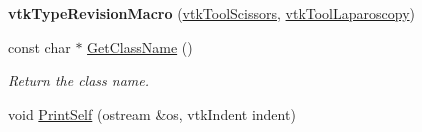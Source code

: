 \begin{DoxyCompactItemize}
\item 
\hypertarget{classvtkToolScissors_a0dfdaf5d716eb50265221bbdef3f702d}{
{\bfseries vtkTypeRevisionMacro} (\hyperlink{classvtkToolScissors}{vtkToolScissors}, \hyperlink{classvtkToolLaparoscopy}{vtkToolLaparoscopy})}
\label{classvtkToolScissors_a0dfdaf5d716eb50265221bbdef3f702d}

\item 
\hypertarget{classvtkToolScissors_a7770d9aeef652f55e1f8a4bd5bbc48f5}{
const char $\ast$ \hyperlink{classvtkToolScissors_a7770d9aeef652f55e1f8a4bd5bbc48f5}{GetClassName} ()}
\label{classvtkToolScissors_a7770d9aeef652f55e1f8a4bd5bbc48f5}

\begin{DoxyCompactList}\small\item\em Return the class name. \item\end{DoxyCompactList}\item 
\hypertarget{classvtkToolScissors_a608e73bf625ddcc27389612e00b81980}{
void \hyperlink{classvtkToolScissors_a608e73bf625ddcc27389612e00b81980}{PrintSelf} (ostream \&os, vtkIndent indent)}
\label{classvtkToolScissors_a608e73bf625ddcc27389612e00b81980}


\end{DoxyCompactItemize}
